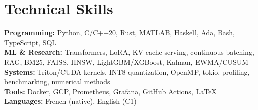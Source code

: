 \documentclass[10pt,a4paper]{article}
\begin{document}
\section*{Technical Skills}
\textbf{Programming:} Python, C/C++20, Rust, MATLAB, Haskell, Ada, Bash, TypeScript, SQL\\
\textbf{ML \& Research:} Transformers, LoRA, KV-cache serving, continuous batching, RAG, BM25, FAISS, HNSW, LightGBM/XGBoost, Kalman, EWMA/CUSUM\\
\textbf{Systems:} Triton/CUDA kernels, INT8 quantization, OpenMP, tokio, profiling, benchmarking, numerical methods\\
\textbf{Tools:} Docker, GCP, Prometheus, Grafana, GitHub Actions, \LaTeX\\
\textbf{Languages:} French (native), English (C1)
\end{document}
